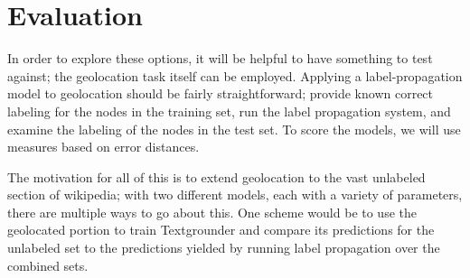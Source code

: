 \documentclass[11pt]{article}
\begin{document}
\section{Evaluation}
In order to explore these options, it will be helpful to have something to test against;
the geolocation task itself can be employed.
Applying a label-propagation model to geolocation should be fairly straightforward; 
provide known correct labeling for the nodes in the training set, run the label
propagation system, and examine the labeling of the nodes in the test set.
To score the models, we will use measures based on error distances.
\par
The motivation for all of this is to extend geolocation to the vast unlabeled
section of wikipedia; with two different models, each with a variety of
parameters, there are multiple ways to go about this.
One scheme would be to use the geolocated portion to train Textgrounder and
compare its predictions for the unlabeled set to the predictions yielded by
running label propagation over the combined sets.



\end{document}
